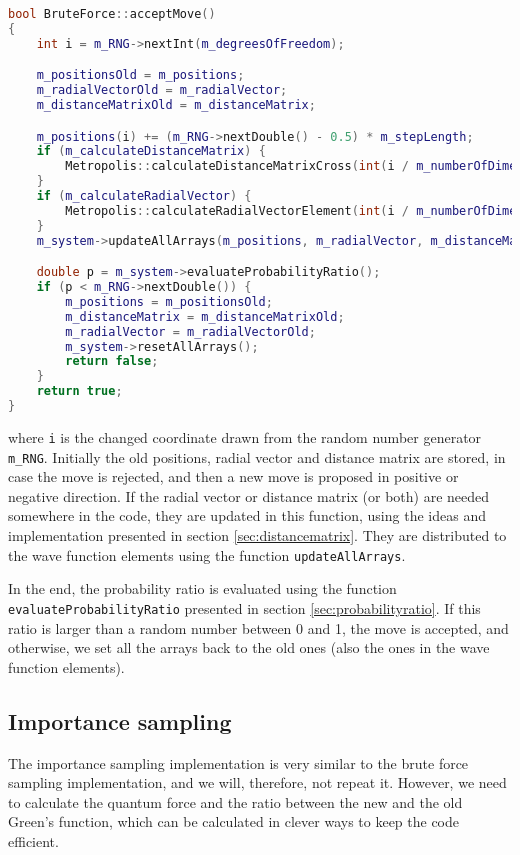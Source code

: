 \begin{lstlisting}[language=c++]
bool BruteForce::acceptMove()
{
	int i = m_RNG->nextInt(m_degreesOfFreedom);

	m_positionsOld = m_positions;
	m_radialVectorOld = m_radialVector;
	m_distanceMatrixOld = m_distanceMatrix;

	m_positions(i) += (m_RNG->nextDouble() - 0.5) * m_stepLength;
	if (m_calculateDistanceMatrix) {
		Metropolis::calculateDistanceMatrixCross(int(i / m_numberOfDimensions));
	}
	if (m_calculateRadialVector) {
		Metropolis::calculateRadialVectorElement(int(i / m_numberOfDimensions));
	}
	m_system->updateAllArrays(m_positions, m_radialVector, m_distanceMatrix, i);

	double p = m_system->evaluateProbabilityRatio();
	if (p < m_RNG->nextDouble()) {
		m_positions = m_positionsOld;
		m_distanceMatrix = m_distanceMatrixOld;
		m_radialVector = m_radialVectorOld;
		m_system->resetAllArrays();
		return false;
	}
	return true;
}
\end{lstlisting}
where \lstinline|i| is the changed coordinate drawn from the random number generator \lstinline|m_RNG|. Initially the old positions, radial vector and distance matrix are stored, in case the move is rejected, and then a new move is proposed in positive or negative direction. If the radial vector or distance matrix (or both) are needed somewhere in the code, they are updated in this function, using the ideas and implementation presented in section \ref{sec:distancematrix}. They are distributed to the wave function elements using the function \lstinline|updateAllArrays|.

In the end, the probability ratio is evaluated using the function \lstinline|evaluateProbabilityRatio| presented in section \ref{sec:probabilityratio}. If this ratio is larger than a random number between 0 and 1, the move is accepted, and otherwise, we set all the arrays back to the old ones (also the ones in the wave function elements). 

\subsection{Importance sampling}
The importance sampling implementation is very similar to the brute force sampling implementation, and we will, therefore, not repeat it. However, we need to calculate the quantum force and the ratio between the new and the old Green's function, which can be calculated in clever ways to keep the code efficient. 

